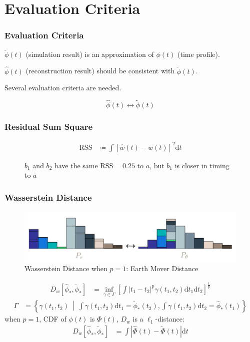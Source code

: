 \documentclass{beamer}
\begin{document}
\section{Evaluation Criteria}

\begin{frame}
\frametitle{Evaluation Criteria}
$\tilde{\phi}(t)$ (simulation result) is an approximation of $\phi(t)$ (time profile). 

$\hat{\phi}(t)$ (reconstruction result) should be consistent with $\tilde{\phi}(t)$. 

Several evaluation criteria are needed. 
\begin{block}{}
\begin{equation*}
    \hat{\phi}(t) \leftrightarrow \tilde{\phi}(t)
\end{equation*}
\end{block}
\end{frame}

\begin{frame}
\frametitle{Residual Sum Square}
\begin{align*}
  \mathrm{RSS} &\coloneqq \int\left[\hat{w}(t) - w(t)\right]^2\mathrm{d}t
\end{align*}
\begin{figure}
    \centering
    \resizebox{1.0\textwidth}{!}{}
    \caption{$b_1$ and $b_2$ have the same $\mathrm{RSS}=0.25$ to $a$, but $b_1$ is closer in timing to $a$}
\end{figure}
\end{frame}

\begin{frame}
\frametitle{Wasserstein Distance}
\begin{figure}
    \centering
    \includegraphics[width=1.0\linewidth]{img/WD.png}
    \caption{Wasserstein Distance when $p=1$: Earth Mover Distance}  
\end{figure}
\begin{align*}
  D_w\left[\hat{\phi}_*, \tilde{\phi}_*\right] &= \inf_{\gamma \in \Gamma} \left[\int \left\vert t_1 - t_2 \right\vert^p \gamma(t_1, t_2)\mathrm{d}t_1\mathrm{d}t_2\right]^{\frac{1}{p}}
\end{align*}
\begin{align*}
  \Gamma &= \left\{\gamma(t_1, t_2) ~\middle\vert~ \int\gamma(t_1,t_2)\mathrm{d}t_1 = \tilde{\phi}_*(t_2) , \int\gamma(t_1,t_2)\mathrm{d}t_2 = \hat{\phi}_*(t_1) \right\}
\end{align*}
when $p=1$, CDF of $\phi(t)$ is $\Phi(t)$, $D_w$ is a $\ell_1$-distance:
\begin{align*}
  D_w\left[\hat{\phi}_*, \tilde{\phi}_*\right] &= \int\left|\hat{\Phi}(t) - \tilde{\Phi}(t)\right| \mathrm{d}t
\end{align*}
\end{frame}
\end{document}
